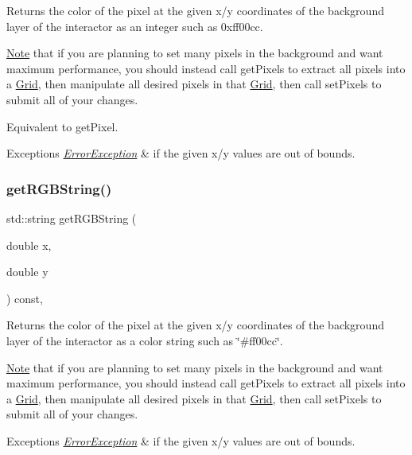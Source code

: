 Returns the color of the pixel at the given x/y coordinates of the background layer of the interactor as an integer such as 0xff00cc. 

\mbox{\hyperlink{classNote}{Note}} that if you are planning to set many pixels in the background and want maximum performance, you should instead call get\+Pixels to extract all pixels into a \mbox{\hyperlink{classGrid}{Grid}}, then manipulate all desired pixels in that \mbox{\hyperlink{classGrid}{Grid}}, then call set\+Pixels to submit all of your changes.

Equivalent to get\+Pixel.


\begin{DoxyExceptions}{Exceptions}
{\em \mbox{\hyperlink{classErrorException}{Error\+Exception}}} & if the given x/y values are out of bounds. \\
\hline
\end{DoxyExceptions}
\mbox{\label{classGDrawingSurface_a456d3582acc3544f37d939f5cb8802fe}} 
\subsubsection{\texorpdfstring{get\+R\+G\+B\+String()}{getRGBString()}}
{\footnotesize\ttfamily std\+::string get\+R\+G\+B\+String (\begin{DoxyParamCaption}\item[{double}]{x,  }\item[{double}]{y }\end{DoxyParamCaption}) const\hspace{0.3cm}{\ttfamily [virtual]}, {\ttfamily [inherited]}}



Returns the color of the pixel at the given x/y coordinates of the background layer of the interactor as a color string such as \char`\"{}\#ff00cc\char`\"{}. 

\mbox{\hyperlink{classNote}{Note}} that if you are planning to set many pixels in the background and want maximum performance, you should instead call get\+Pixels to extract all pixels into a \mbox{\hyperlink{classGrid}{Grid}}, then manipulate all desired pixels in that \mbox{\hyperlink{classGrid}{Grid}}, then call set\+Pixels to submit all of your changes.


\begin{DoxyExceptions}{Exceptions}
{\em \mbox{\hyperlink{classErrorException}{Error\+Exception}}} & if the given x/y values are out of bounds. \\
\hline
\end{DoxyExceptions}
\mbox{\label{classGInteractor_a7b4eec96a2bdc6420695d5796a78eea9}} 
